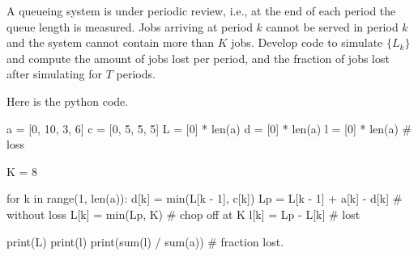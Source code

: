 \begin{exercise}\label{ex:l-115} 
A queueing system   is  under periodic review, i.e., at the end of each period the queue length is measured.
Jobs arriving at period $k$ cannot be served  in period $k$ and the system cannot contain more than $K$ jobs.
Develop code to simulate $\{L_k\}$ and compute the amount of jobs lost per period, and  the fraction of jobs lost after simulating for $T$ periods. 

\begin{solution}

Here is the python code.

\begin{pyconsole}
a = [0, 10, 3, 6]
c = [0, 5, 5, 5]
L = [0] * len(a)
d = [0] * len(a)
l = [0] * len(a)  # loss

K = 8

for k in range(1, len(a)):
    d[k] = min(L[k - 1], c[k])
    Lp = L[k - 1] + a[k] - d[k]  #  without loss
    L[k] = min(Lp, K)  #  chop off at K
    l[k] = Lp - L[k]  #  lost


print(L)
print(l)
print(sum(l) / sum(a))  # fraction lost.
\end{pyconsole}
\end{solution}
\end{exercise}


